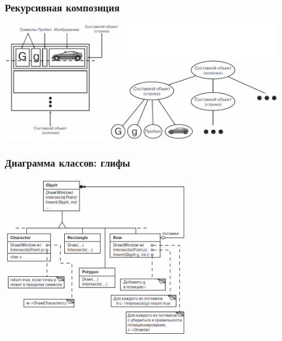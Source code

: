 \documentclass{../cscslides}
\begin{document}
    \begin{frame}
        \frametitle{Рекурсивная композиция}
        \begin{center}
            \includegraphics[width=0.9\textwidth]{recursiveComposition.png}
        \end{center}
    \end{frame}

    \begin{frame}
        \frametitle{Диаграмма классов: глифы}
        \begin{center}
            \includegraphics[width=0.6\textwidth]{glyphs.png}
        \end{center}
    \end{frame}
\end{document}
